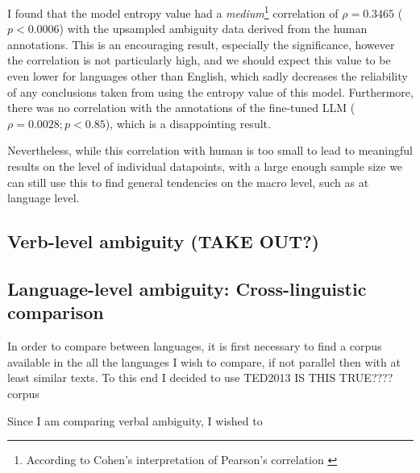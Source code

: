 I found that the model entropy value had a \emph{medium}\footnote{According to Cohen's interpretation of Pearson's correlation \citep{cohen1988spa}} correlation of $\rho = 0.3465$ ($p < 0.0006$) with the upsampled ambiguity data derived from the human annotations. This is an encouraging result, especially the significance, however the correlation is not particularly high, and we should expect this value to be even lower for languages other than English, which sadly decreases the reliability of any conclusions taken from using the entropy value of this model. Furthermore, there was no correlation with the annotations of the fine-tuned LLM ($\rho = 0.0028; p < 0.85$), which is a disappointing result. 

Nevertheless, while this correlation with human is too small to lead to meaningful results on the level of individual datapoints, with a large enough sample size we can still use this to find general tendencies on the macro level, such as at language level.

\subsection{Verb-level ambiguity (TAKE OUT?)}

\subsection{Language-level ambiguity: Cross-linguistic comparison}

In order to compare between languages, it is first necessary to find a corpus available in the all the languages I wish to compare, if not parallel then with at least similar texts. To this end I decided to use TED2013 IS THIS TRUE???? corpus

Since I am comparing verbal ambiguity, I wished to 

